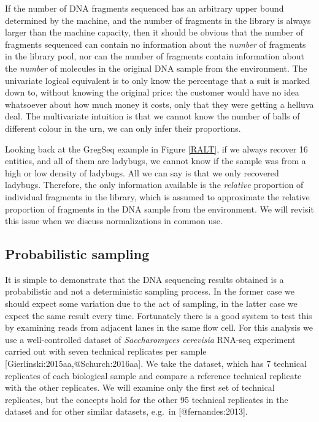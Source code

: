 \documentclass[
  onecolumn]{article}
\begin{document}
If the number of DNA fragments sequenced has an arbitrary upper bound determined by the machine, and the number of fragments in the library is always larger than the machine capacity, then it should be obvious that the number of fragments sequenced can contain no information about the \emph{number} of fragments in the library pool, nor can the number of fragments contain information about the \emph{number} of molecules in the original DNA sample from the environment. The univariate logical equivalent is to only know the percentage that a suit is marked down to, without knowing the original price: the customer would have no idea whatsoever about how much money it costs, only that they were getting a helluva deal. The multivariate intuition is that we cannot know the number of balls of different colour in the urn, we can only infer their proportions.

Looking back at the GregSeq example in Figure \ref{RALT}, if we always recover 16 entities, and all of them are ladybugs, we cannot know if the sample was from a high or low density of ladybugs. All we can say is that we only recovered ladybugs. Therefore, the only information available is the \emph{relative} proportion of individual fragments in the library, which is assumed to approximate the relative proportion of fragments in the DNA sample from the environment. We will revisit this issue when we discuss normalizations in common use.

\hypertarget{probabilistic-sampling}{%
\subsection{Probabilistic sampling}\label{probabilistic-sampling}}

It is simple to demonstrate that the DNA sequencing results obtained is a probabilistic and not a deterministic sampling process. In the former case we should expect some variation due to the act of sampling, in the latter case we expect the same result every time. Fortunately there is a good system to test this by examining reads from adjacent lanes in the same flow cell. For this analysis we use a well-controlled dataset of \emph{Saccharomyces cerevisia} RNA-seq experiment carried out with seven technical replicates per sample {[}Gierlinski:2015aa,@Schurch:2016aa{]}. We take the dataset, which has 7 technical replicates of each biological sample and compare a reference technical replicate with the other replicates. We will examine only the first set of technical replicates, but the concepts hold for the other 95 technical replicates in the dataset and for other similar datasets, e.g.~in {[}@fernandes:2013{]}.
\end{document}
